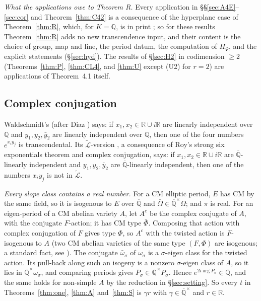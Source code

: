 \documentclass[11pt]{amsart}
\theoremstyle{definition}
\newcommand{\Qb}{\overline{\mathbb{Q}}}
\newcommand{\Q}{\mathbb{Q}}
\newcommand{\R}{\mathbb{R}}
\newcommand{\Lt}{\widetilde{\mathcal{L}}}
\begin{document}
\emph{What the applications owe to Theorem R.} Every application in \S\S\ref{sec:A4E}--\ref{sec:cor} and
Theorem~\ref{thm:C42} is a consequence of the hyperplane case of Theorem~\ref{thm:R}, which, for $K=\Q$, is in print
\cite[\S5d]{W88}; so for these results Theorem~\ref{thm:R} adds no new transcendence input, and their content is the choice of
group, map and line, the period datum, the computation of $H_\Psi$, and the explicit statements (\S\ref{sec:hyd}). The
results of \S\ref{sec:H2} in codimension $\ge2$ (Theorems~\ref{thm:P}, \ref{thm:CL4}, and \ref{thm:U} except (U2) for
$r=2$) are applications of Theorem~4.1 itself.

\subsection{Complex conjugation}\label{sec:conj}
Waldschmidt's \cite[Cor.~2.7]{W07} (after Diaz \cite{Di04}) says: if $x_1,x_2\in\R\cup i\R$ are linearly independent
over $\Q$ and $y_1,y_2,\bar y_2$ are linearly independent over $\Q$, then one of the four numbers $e^{x_iy_j}$ is
transcendental. Its $\Lt$-version \cite[Thm.~4.1]{W07}, a consequence of Roy's strong six exponentials theorem and complex
conjugation, says: if $x_1,x_2\in\R\cup i\R$ are $\Qb$-linearly independent and $y_1,y_2,\bar y_2$ are $\Qb$-linearly
independent, then one of the numbers $x_iy_j$ is not in $\Lt$.

\emph{Every slope class contains a real number.} For a CM elliptic period, $\bar E$ has CM by the same field, so it is
isogenous to $E$ over $\Qb$ and $\bar\Omega\in\Qb^\times\Omega$; and $\pi$ is real. For an eigen-period of a CM abelian
variety $A$, let $A^c$ be the complex conjugate of $A$, with the conjugate $F$-action; it has CM type $\bar\Phi$. Composing
that action with complex conjugation of $F$ gives type $\Phi$, so $A^c$ with the twisted action is $F$-isogenous to $A$ (two
CM abelian varieties of the same type $(F,\Phi)$ are isogenous; a standard fact, see \cite{Sh98}). The conjugate $\bar\omega_\sigma$ of
$\omega_\sigma$ is a $\sigma$-eigen class for the twisted action. Its pull-back along such an isogeny is a nonzero
$\sigma$-eigen class of $A$, so it lies in $\Qb^\times\omega_\sigma$, and comparing periods gives
$\bar P_\sigma\in\Qb^\times P_\sigma$. Hence $e^{2i\arg P_\sigma}\in\Qb$, and the same holds for non-simple $A$ by the
reduction in \S\ref{sec:setting}. So every $t$ in Theorems~\ref{thm:one}, \ref{thm:A} and~\ref{thm:S} is $\gamma r$ with
$\gamma\in\Qb^\times$ and $r\in\R$.
\end{document}
